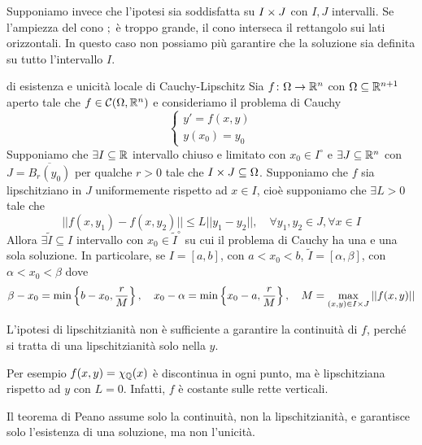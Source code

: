 \documentclass[a4paper]{article}
\begin{document}
Supponiamo invece che l'ipotesi sia soddisfatta su \(I \times J\) con \(I, J\) intervalli.
Se l'ampiezza del cono \(;\) è troppo grande, il cono interseca il rettangolo sui lati orizzontali.
In questo caso non possiamo più garantire che la soluzione sia definita su tutto l'intervallo \(I\).

\begin{snippettheorem}{di esistenza e unicità locale di Cauchy-Lipschitz}
    Sia \(f\colon \Omega \to \mathbb{R}^n\) con \(\Omega \subseteq \mathbb{R}^{n+1}\) aperto
    tale che \(f \in \mathcal C(\Omega, \mathbb{R}^n)\)
    e consideriamo il problema di Cauchy
    \[
        \begin{cases}
            y' = f(x,y) \\
            y(x_0) = y_0
        \end{cases}
    \]
    Supponiamo che \(\exists I \subseteq \mathbb{R}\) intervallo chiuso e limitato con \(x_0 \in I^\circ\) e
    \(\exists J \subseteq \mathbb{R}^n\) con \(J = \overline{B_r(y_0)}\) per qualche \(r>0\) tale che
    \(I \times J \subseteq \Omega\). Supponiamo che \(f\) sia lipschitziano
    in \(J\) uniformemente rispetto ad \(x \in I\), cioè supponiamo che \(\exists L > 0\) tale che
    \[
        ||f(x,y_1) - f(x, y_2)|| \leq L||y_1-y_2||, \quad \forall y_1, y_2 \in J, \forall x \in I
    \]
    Allora \(\exists \tilde I \subseteq I\) intervallo con \(x_0 \in \tilde I^\circ\) su cui il problema di Cauchy
    ha una e una sola soluzione. In particolare, se \(I=[a,b]\), con \(a < x_0 < b\), \(\tilde I = [\alpha, \beta]\),
    con \(\alpha < x_0 < \beta\) dove
    \[
        \beta-x_0 = \min\left\{b-x_0, \frac{r}{M}\right\}, \quad
        x_0-\alpha = \min\left\{x_0-a, \frac{r}{M}\right\}, \quad
        M = \max_{(x,y) \in I \times J} ||f(x,y)||
    \]
\end{snippettheorem}

L'ipotesi di lipschitzianità non è sufficiente a garantire la continuità
di \(f\), perché si tratta di una lipschitzianità solo nella \(y\).

Per esempio \(f(x,y) = \chi_{\mathbb{Q}}(x)\) è discontinua in ogni punto, ma è lipschitziana rispetto ad \(y\) con \(L=0\).
Infatti, \(f\) è costante sulle rette verticali.

Il teorema di Peano assume solo la continuità, non la lipschitzianità, e garantisce solo l'esistenza di una soluzione, ma non l'unicità.
\end{document}
